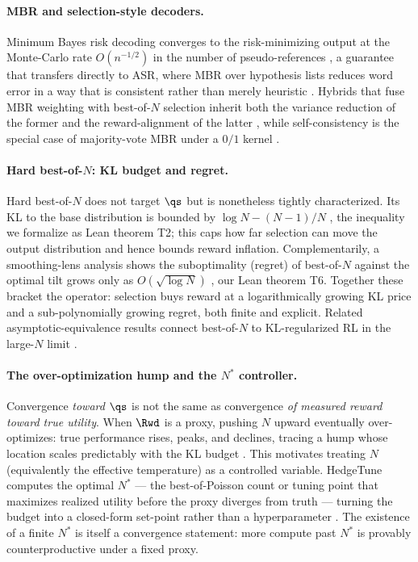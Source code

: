 \paragraph{MBR and selection-style decoders.} Minimum Bayes risk decoding converges to the risk-minimizing output at the Monte-Carlo rate $O(n^{-1/2})$ in the number of pseudo-references \citep{ichihara2025mbr}, a guarantee that transfers directly to ASR, where MBR over hypothesis lists reduces word error in a way that is consistent rather than merely heuristic \citep{mbrasr2025}. Hybrids that fuse MBR weighting with best-of-$N$ selection inherit both the variance reduction of the former and the reward-alignment of the latter \citep{jinnai2024mbrbon}, while self-consistency is the special case of majority-vote MBR under a $0/1$ kernel \citep{wang2023selfconsistency}.

\paragraph{Hard best-of-$N$: KL budget and regret.} Hard best-of-$N$ does not target $\qs$ but is nonetheless tightly characterized. Its KL to the base distribution is bounded by $\log N - (N-1)/N$ \citep{beirami2024bon}, the inequality we formalize as Lean theorem T2; this caps how far selection can move the output distribution and hence bounds reward inflation. Complementarily, a smoothing-lens analysis shows the suboptimality (regret) of best-of-$N$ against the optimal tilt grows only as $O(\sqrt{\log N})$ \citep{aminian2025smoothing}, our Lean theorem T6. Together these bracket the operator: selection buys reward at a logarithmically growing KL price and a sub-polynomially growing regret, both finite and explicit. Related asymptotic-equivalence results connect best-of-$N$ to KL-regularized RL in the large-$N$ limit \citep{yang2024asymptotics,gui2024bonbon}.

\paragraph{The over-optimization hump and the $N^\ast$ controller.} Convergence \emph{toward $\qs$} is not the same as convergence \emph{of measured reward toward true utility}. When $\Rwd$ is a proxy, pushing $N$ upward eventually over-optimizes: true performance rises, peaks, and declines, tracing a hump whose location scales predictably with the KL budget \citep{gao2023overopt}. This motivates treating $N$ (equivalently the effective temperature) as a controlled variable. HedgeTune computes the optimal $N^\ast$ — the best-of-Poisson count or tuning point that maximizes realized utility before the proxy diverges from truth — turning the budget into a closed-form set-point rather than a hyperparameter \citep{khalaf2025hedgetune}. The existence of a finite $N^\ast$ is itself a convergence statement: more compute past $N^\ast$ is provably counterproductive under a fixed proxy.

